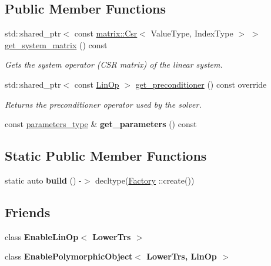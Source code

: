 \subsection*{Public Member Functions}
\begin{DoxyCompactItemize}
\item 
std\+::shared\+\_\+ptr$<$ const \hyperlink{classgko_1_1matrix_1_1Csr}{matrix\+::\+Csr}$<$ Value\+Type, Index\+Type $>$ $>$ \hyperlink{classgko_1_1solver_1_1LowerTrs_a1f18336cc86c363eb41da44c2d282497}{get\+\_\+system\+\_\+matrix} () const
\begin{DoxyCompactList}\small\item\em Gets the system operator (C\+SR matrix) of the linear system. \end{DoxyCompactList}\item 
std\+::shared\+\_\+ptr$<$ const \hyperlink{classgko_1_1LinOp}{Lin\+Op} $>$ \hyperlink{classgko_1_1solver_1_1LowerTrs_a9ee1b8b9f5420c4214f22d15bf61e755}{get\+\_\+preconditioner} () const override
\begin{DoxyCompactList}\small\item\em Returns the preconditioner operator used by the solver. \end{DoxyCompactList}\item 
\mbox{\label{classgko_1_1solver_1_1LowerTrs_a1dd87ee6836fff7e9a62f2971f7cc5e1}} 
const \hyperlink{structgko_1_1solver_1_1LowerTrs_1_1parameters__type}{parameters\+\_\+type} \& {\bfseries get\+\_\+parameters} () const
\end{DoxyCompactItemize}
\subsection*{Static Public Member Functions}
\begin{DoxyCompactItemize}
\item 
\mbox{\label{classgko_1_1solver_1_1LowerTrs_a0e54d12a1ae4dd748921c30bfba3c035}} 
static auto {\bfseries build} () -\/$>$ decltype(\hyperlink{classgko_1_1solver_1_1LowerTrs_1_1Factory}{Factory} \+::create())
\end{DoxyCompactItemize}
\subsection*{Friends}
\begin{DoxyCompactItemize}
\item 
\mbox{\label{classgko_1_1solver_1_1LowerTrs_a5c81503df42d4ccbfaffe2853edfb9d3}} 
class {\bfseries Enable\+Lin\+Op$<$ Lower\+Trs $>$}
\item 
\mbox{\label{classgko_1_1solver_1_1LowerTrs_ab80a792714a7414ceed81c40078f3cc3}} 
class {\bfseries Enable\+Polymorphic\+Object$<$ Lower\+Trs, Lin\+Op $>$}
\end{DoxyCompactItemize}



